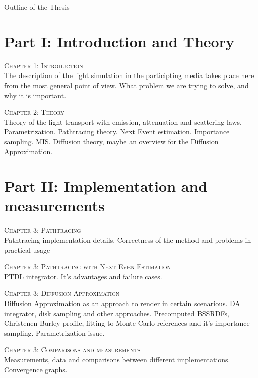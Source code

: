 \newpage

{}

\begin{center}
	\huge{Outline of the Thesis}
\end{center}

\section*{Part I: Introduction and Theory}

 {\scshape Chapter 1: Introduction}\\
The description of the light simulation in the participting media
takes place here from the most general point of view. What problem we are trying
to solve, and why it is important.

{\scshape Chapter 2: Theory}\\
Theory of the light transport with emission, attenuation and
scattering laws. Parametrization. Pathtracing theory. Next Event estimation.
Importance sampling.
MIS. Diffusion theory, maybe an overview for the Diffusion Approximation.

\section*{Part II: Implementation and measurements}

{\scshape Chapter 3: Pathtracing}\\
Pathtracing implementation details. Correctness of the method and
problems in practical usage

{\scshape Chapter 3: Pathtracing with Next Even Estimation}\\
PTDL integrator. It's advantages and failure cases.

{\scshape Chapter 3: Diffusion Approximation}\\
Diffusion Approximation as an approach to render in certain
scenarious. DA integrator, disk sampling and other approaches. Precomputed
BSSRDFs, Christenen Burley profile, fitting to Monte-Carlo references and
it's importance sampling. Parametrization issue.

{\scshape Chapter 3: Comparisons and measurements}\\
Measurements, data and comparisons between different
implementations. Convergence graphs.

